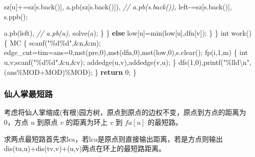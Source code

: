 \documentclass[
]{article}
\newenvironment{Shaded}{}{}
\newcommand{\CommentTok}[1]{\textcolor[rgb]{0.38,0.63,0.69}{\textit{#1}}}
\newcommand{\ControlFlowTok}[1]{\textcolor[rgb]{0.00,0.44,0.13}{\textbf{#1}}}
\newcommand{\DataTypeTok}[1]{\textcolor[rgb]{0.56,0.13,0.00}{#1}}
\newcommand{\DecValTok}[1]{\textcolor[rgb]{0.25,0.63,0.44}{#1}}
\newcommand{\NormalTok}[1]{#1}
\newcommand{\SpecialCharTok}[1]{\textcolor[rgb]{0.25,0.44,0.63}{#1}}
\newcommand{\StringTok}[1]{\textcolor[rgb]{0.25,0.44,0.63}{#1}}
\begin{document}
\begin{Shaded}
\begin{Highlighting}[]
\NormalTok{                sz[u]+=sz[s.back()],}
\NormalTok{                a.pb(sz[s.back()]), }\CommentTok{// a.pb(s.back()),}
\NormalTok{                left{-}=sz[s.back()],}
\NormalTok{                s.ppb();}

\NormalTok{                a.pb(left), }\CommentTok{// a.pb(u),}
\NormalTok{                solve(a);}
\NormalTok{            \}}
\NormalTok{        \}}
        \ControlFlowTok{else}\NormalTok{ low[u]=min(low[u],dfn[v]);}
\NormalTok{    \}}
\NormalTok{\}}
\DataTypeTok{int}\NormalTok{ work()}
\NormalTok{\{}
\NormalTok{    MC}
\NormalTok{    \{}
\NormalTok{        scanf(}\StringTok{"}\SpecialCharTok{\%d\%d}\StringTok{"}\NormalTok{,\&n,\&m);}
\NormalTok{        edge\_cnt=tim=ans=}\DecValTok{0}\NormalTok{,mst(pre,}\DecValTok{0}\NormalTok{),mst(dfn,}\DecValTok{0}\NormalTok{),mst(low,}\DecValTok{0}\NormalTok{),s.clear();}
\NormalTok{        fp(i,}\DecValTok{1}\NormalTok{,m)}
\NormalTok{        \{}
            \DataTypeTok{int}\NormalTok{ u,v;scanf(}\StringTok{"}\SpecialCharTok{\%d\%d}\StringTok{"}\NormalTok{,\&u,\&v);}
\NormalTok{            addedge(u,v),addedge(v,u);}
\NormalTok{        \}}
\NormalTok{        dfs(}\DecValTok{1}\NormalTok{,}\DecValTok{0}\NormalTok{),printf(}\StringTok{"}\SpecialCharTok{\%lld\textbackslash{}n}\StringTok{"}\NormalTok{,(ans\%MOD+MOD)\%MOD);}
\NormalTok{    \}}
    \ControlFlowTok{return} \DecValTok{0}\NormalTok{;}
\NormalTok{\}}
\end{Highlighting}
\end{Shaded}

\hypertarget{ux4ed9ux4ebaux638cux6700ux77edux8def}{%
\subsubsection{仙人掌最短路}\label{ux4ed9ux4ebaux638cux6700ux77edux8def}}

考虑将仙人掌缩成(有根)园方树，原点到原点的边权不变，原点到方点的距离为0，方点
\(u\) 到原点 \(v\) 的距离为环上 \(v\) 到 \(fa[u]\) 的最短路。

求两点最短路首先求lca，若lca是原点则直接输出距离，若是方点则输出
dis(tu,u)+dis(tv,v)+(u,v)两点在环上的最短路距离。
\end{document}

